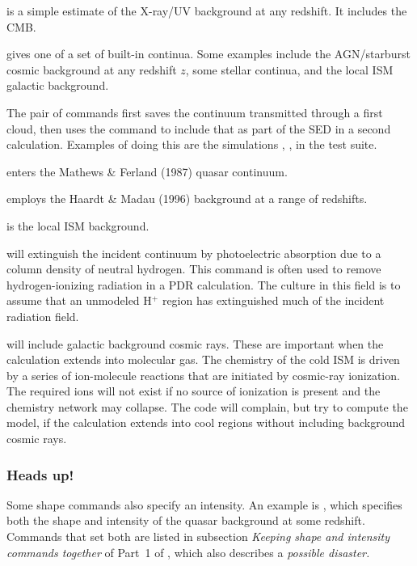 \documentclass[12pt,twoside]{article}
\begin{document}
{ is a simple estimate
of the X-ray/UV background at any
redshift.  It includes the CMB.

 gives one of a set of built-in
continua.  Some examples include
the AGN\slash starburst cosmic background at any redshift $z$, some stellar
continua, and the local ISM galactic background.

The  pair of commands
first saves the continuum transmitted through a first cloud, then uses the
 command to include that
as part of the SED in a second calculation.  Examples of doing this
are the simulations 
, ,
 in the test suite.  

 enters the Mathews \& Ferland (1987) quasar continuum.

 employs the Haardt
\& Madau (1996) background at a range of redshifts.

 is the local ISM background.

 \label{command:extinguish}will extinguish
the incident continuum by photoelectric
absorption due to a column density of neutral hydrogen.  This command is
often used to remove hydrogen-ionizing radiation in a PDR calculation.
The culture in this field is to assume that an unmodeled H$^+$ region has extinguished much of the incident radiation field.

 will include
galactic background cosmic rays.
These are important when the calculation extends into molecular gas.  The
chemistry of the cold ISM is driven by a series of ion-molecule reactions
that are initiated by cosmic-ray ionization.  The required ions will not
exist if no source of ionization is present and the chemistry network may
collapse.  The code will complain, but try to compute the model, if the
calculation extends into cool regions without including background cosmic
rays.

\subsubsection{Heads up!}

Some shape commands also specify
an intensity.  An example is , which
specifies both the shape and intensity of the quasar
background at some redshift. Commands that set both are listed in subsection
\emph{Keeping shape and intensity commands together}
of Part~1 of \Hazy, which also
describes a \emph{possible disaster.}

}
\end{document}
